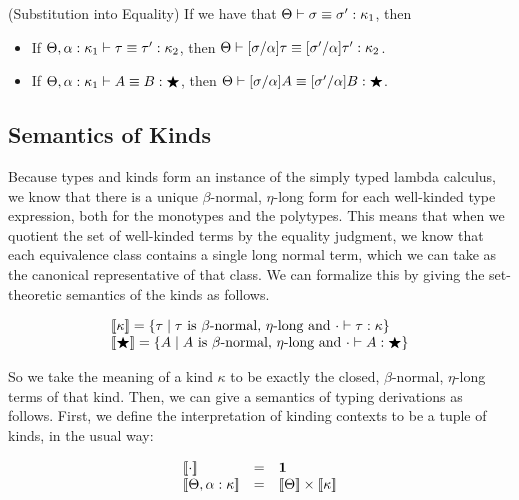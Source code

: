 \begin{prop}{(Substitution into Equality)}
  If we have that $\judgeKeq{\sigma}{\sigma'}{\kappa_1}$, then 
  \begin{itemize}
    \item If $\judgeKeq[\Theta, \alpha:\kappa_1]{\tau}{\tau'}{\kappa_2}$, then
             $\judgeKeq{[\sigma/\alpha]\tau}{[\sigma'/\alpha]\tau'}{\kappa_2}$.
    \item If $\judgeKeq[\Theta, \alpha:\kappa_1]{A}{B}{\bigstar}$, then
             $\judgeKeq{[\sigma/\alpha]A}{[\sigma'/\alpha]B}{\bigstar}$.
  \end{itemize}
\end{prop}

\subsection{Semantics of Kinds}

Because types and kinds form an instance of the simply typed lambda
calculus, we know that there is a unique $\beta$-normal, $\eta$-long
form for each well-kinded type expression, both for the monotypes and
the polytypes. This means that when we quotient the set of well-kinded
terms by the equality judgment, we know that each equivalence class
contains a single long normal term, which we can take as the canonical
representative of that class. We can formalize this by giving the
set-theoretic semantics of the kinds as follows.

\begin{displaymath}
  \begin{array}{l}
    \interp{\kappa} = \comprehend{\tau}{\tau \mbox{ is $\beta$-normal, $\eta$-long} 
                                        \mbox{ and } \judgeWK[\cdot]{\tau}{\kappa} } \\
    \interp{\bigstar} = \comprehend{A}{A \mbox{ is $\beta$-normal, $\eta$-long} 
                                       \mbox{ and } \judgeWK[\cdot]{A}{\bigstar} }
  \end{array}
\end{displaymath}

So we take the meaning of a kind $\kappa$ to be exactly the closed,
$\beta$-normal, $\eta$-long terms of that kind. Then, we can give a semantics of
typing derivations as follows. First, we define the interpretation of kinding 
contexts to be a tuple of kinds, in the usual way:

\begin{displaymath}
  \begin{array}{lcl}
    \interp{\cdot} & = & \unittype \\
    \interp{\Theta, \alpha:\kappa} & = & \interp{\Theta} \times \interp{\kappa} \\
  \end{array}
\end{displaymath}

